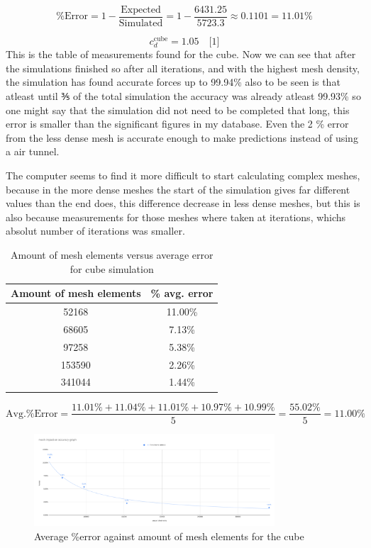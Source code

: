\documentclass[12pt,a4paper]{article}
\begin{document}
\[
\text{\% Error} = 1 - \frac{\text{Expected}}{\text{Simulated}} = 1 - \frac{6431.25}{5723.3} \approx 0.1101 = 11.01\%
\]

\[
c_d^{\text{cube}} = 1.05 \quad \text{[1]}
\]
This is the table of measurements found for the cube. Now we can see that  after the simulations finished so after all iterations, and with the highest mesh density, the simulation has found accurate forces up to 99.94\% also to be seen is that atleast until ⅗ of the total simulation the accuracy was already atleast 99.93\% so one might say that the simulation did not need to be completed that long, this error is smaller than the significant figures in my database. Even the 2 \% error from the less dense mesh is accurate enough to make predictions instead of using a air tunnel. 

The computer seems to find it more difficult to start calculating complex meshes, because in the more dense meshes the start of the simulation gives far different values than the end does, this difference decrease in less dense meshes, but this is also because measurements for those meshes where taken at iterations, whichs absolut number of iterations was smaller.

\begin{table}[H]
\centering
\caption{Amount of mesh elements versus average error for cube simulation}
\label{tab:cube_elements_error}
\begin{tabular}{|c|c|}
\hline
\rowcolor{lightblue}
\textbf{Amount of mesh elements} & \textbf{\% avg. error}\\
\hline
52168 & 11.00\% \\
\hline
68605 & 7.13\% \\
\hline
97258 & 5.38\% \\
\hline
153590 & 2.26\% \\
\hline
341044 & 1.44\% \\
\hline
\end{tabular}
\end{table}

\[
\text{Avg.\% Error} = \frac{11.01\% + 11.04\% + 11.01\% + 10.97\% + 10.99\%}{5} = \frac{55.02\%}{5} = 11.00\%
\]

\begin{figure}[H]
\centering
\includegraphics[width=0.8\textwidth]{image14.png}
\caption{Average \%error against amount of mesh elements for the cube}
\label{fig:cube_elements_error}
\end{figure}
\end{document}
